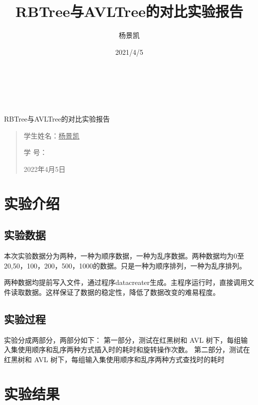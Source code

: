 \documentclass[UTF8]{ctexart}
\date{}
\title{RBTree与AVLTree的对比实验报告}
\author{杨景凯}
\date{2021/4/5}
\begin{document}
 
\begin{center}
    \quad \\
    \quad \\
    \quad \\
    \vskip 3.5cm
    \heiti {}RBTree与AVLTree的对比实验报告\\
\end{center}
\vskip 3.5cm
\begin{quotation}
    \songti \fontsize{30}{30}
    \doublespacing
    \par\setlength\parindent{12em}
    \quad 
\begin{center}

    学生姓名：\underline{\qquad    \quad \quad 杨景凯    \quad  \quad\qquad }

    学\hspace{0.61cm} 号：\underline{\quad \quad{}\quad\quad}

\end{center}
    
    \centering
    2022年4月5日
\end{quotation}
\clearpage
\tableofcontents
\clearpage
\section{实验介绍}
\subsection{实验数据}

本次实验数据分为两种，一种为顺序数据，一种为乱序数据。两种数据均为0至20,50，100，200，500，1000的数据。只是一种为顺序排列，一种为乱序排列。

两种数据均提前写入文件，通过程序datacreater生成。主程序运行时，直接调用文件读取数据。这样保证了数据的稳定性，降低了数据改变的难易程度。
\subsection{实验过程}
实验分成两部分，两部分如下：
第一部分，测试在红黑树和 AVL 树下，每组输入集使用顺序和乱序两种方式插入时的耗时和旋转操作次数。
第二部分，测试在红黑树和 AVL 树下，每组输入集使用顺序和乱序两种方式查找时的耗时
\section{实验结果}
\end{document}
